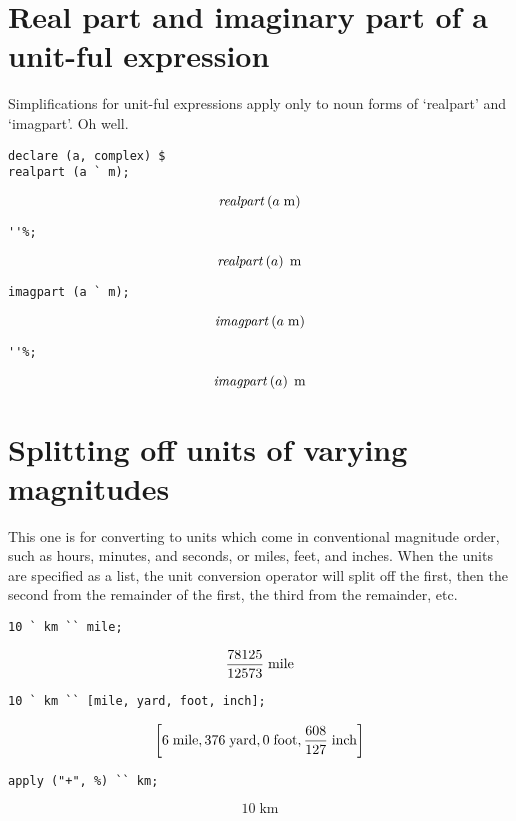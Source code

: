 \documentclass[12pt]{article}
\begin{document}
\section{Real part and imaginary part of a unit-ful expression
}
Simplifications for unit-ful expressions apply only to noun forms of `realpart' and `imagpart'.
Oh well.
\begin{verbatim}
declare (a, complex) $
realpart (a ` m);
\end{verbatim}
$${\it realpart}\left(a\;\mathrm{m}\right)$$
\begin{verbatim}
''%;
\end{verbatim}
$${\it realpart}\left(a\right)\;\mathrm{m}$$
\begin{verbatim}
imagpart (a ` m);
\end{verbatim}
$${\it imagpart}\left(a\;\mathrm{m}\right)$$
\begin{verbatim}
''%;
\end{verbatim}
$${\it imagpart}\left(a\right)\;\mathrm{m}$$
\section{Splitting off units of varying magnitudes
}
This one is for converting to units which come in conventional magnitude order,
such as hours, minutes, and seconds, or miles, feet, and inches.
When the units are specified as a list,
the unit conversion operator will split off the first,
then the second from the remainder of the first,
the third from the remainder, etc.
\begin{verbatim}
10 ` km `` mile;
\end{verbatim}
$${{78125}\over{12573}}\;\mathrm{mile}$$
\begin{verbatim}
10 ` km `` [mile, yard, foot, inch];
\end{verbatim}
$$\left[ 6\;\mathrm{mile} , 376\;\mathrm{yard} , 0\;\mathrm{foot} , 
 {{608}\over{127}}\;\mathrm{inch} \right] $$
\begin{verbatim}
apply ("+", %) `` km;
\end{verbatim}
$$10\;\mathrm{km}$$
\end{document}
